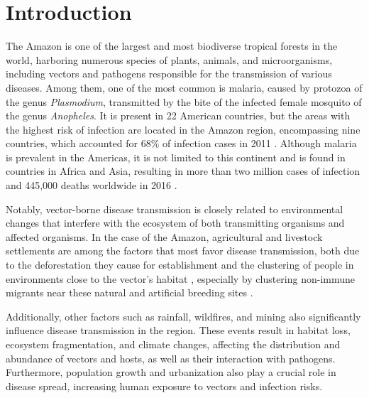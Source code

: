\documentclass[3p,times]{elsarticle}
\begin{document}

\section{Introduction}
\label{}
The Amazon is one of the largest and most biodiverse tropical forests 
in the world, harboring numerous species of plants, animals, and 
microorganisms, including vectors and pathogens responsible for the 
transmission of various diseases. Among them, one of the most common 
is malaria, caused by protozoa of the genus \textit{Plasmodium}, 
transmitted by the bite of the infected female mosquito of the genus 
\textit{Anopheles}. It is present in 22 American countries, but the 
areas with the highest risk of infection are located in the Amazon 
region, encompassing nine countries, which accounted for $68\%$ of 
infection cases in 
2011 \cite{pimenta_orfano_bahia_duarte_rios-velasquez_melo_pessoa_oliveira_campos_villegas_etal_2015}. 
Although malaria is prevalent in the Americas, it is 
not limited to this continent and is found in countries in Africa and Asia, 
resulting in more than two million cases of infection and 445,000 deaths 
worldwide in 2016 \cite{regulation_of_sexual_commitment}.

Notably, vector-borne disease transmission is closely related to 
environmental changes that interfere with the ecosystem of both 
transmitting organisms and affected organisms. In the case of the 
Amazon, agricultural and livestock settlements are among the factors
that most favor disease transmission, both due to the deforestation 
they cause for establishment and the clustering of people in environments 
close to the vector's habitat \cite{silva-nunes_malaria_amazon_2008}, 
especially by clustering non-immune migrants near these natural and 
artificial breeding sites \cite{DASILVANUNES2012281}.

Additionally, other factors such as rainfall, wildfires, and mining 
also significantly influence disease transmission in the region. These 
events result in habitat loss, ecosystem fragmentation, and climate 
changes, affecting the distribution and abundance of vectors and hosts, 
as well as their interaction with pathogens. Furthermore, population growth 
and urbanization also play a crucial role in disease spread, increasing 
human exposure to vectors and infection risks.
\end{document}
